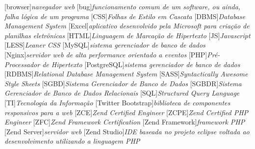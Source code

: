 
[browser]{\textit{navegador web}}
[bug]{\textit{funcionamento comum de um software, ou ainda, falha lógica de um programa}}
[CSS]{\textit{Folhas de Estilo em Cascata}}
[DBMS]{\textit{Database Management System}}
[Excel]{\textit{aplicativo desenvolvido pela Microsoft para
criação de planilhas eletrônicas}}
[HTML]{\textit{Linguagem de Marcação de Hipertexto}}
[JS]{\textit{Javascript}}
[LESS]{\textit{Leaner CSS}}
[MySQL]{\textit{sistema gerenciador de banco de dados}}
[Nginx]{\textit{servidor web de alta performance orientado a
eventos}}
[PHP]{\textit{Pré-Processador de Hipertexto}}
[PostgreSQL]{\textit{sistema gerenciador de banco de dados}}
[RDBMS]{\textit{Relational Database Management System}}
[SASS]{\textit{Syntactically Awesome Style Sheets}}
[SGBD]{\textit{Sistema Gerenciador de Banco de Dados}}
[SGBDR]{\textit{Sistema Gerenciador de Banco de Dados Relacionais}}
[SQL]{\textit{Structured Query Language}}
[TI]{\textit{Tecnologia da Informação}}
[Twitter Bootstrap]{\textit{biblioteca de
componentes responsivos para a web}}
[ZCE]{\textit{Zend Certified Engineer}}
[ZCPE]{\textit{Zend Certified PHP Engineer}}
[ZFC]{\textit{Zend Framework Certification}}
[Zend Framework]{\textit{framework PHP}}
[Zend Server]{\textit{servidor web}}
[Zend Studio]{\textit{IDE baseada no projeto eclipse voltada ao
desenvolvimento utilizando a linguagem PHP}}
